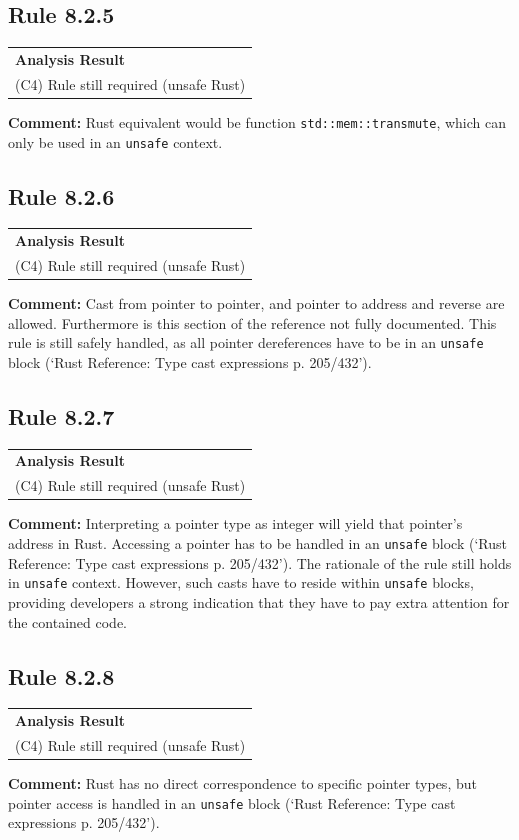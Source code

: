 \subsection*{Rule 8.2.5}
\begin{longtable}{p{13cm}}
\textbf{Analysis Result} \\
(C4) Rule still required (unsafe Rust) \\
\end{longtable}
\textbf{Comment:} Rust equivalent would be function \texttt{std::mem::transmute}, which can only be used in an \texttt{unsafe} context. \\
\subsection*{Rule 8.2.6}
\begin{longtable}{p{13cm}}
\textbf{Analysis Result} \\
(C4) Rule still required (unsafe Rust) \\
\end{longtable}
\textbf{Comment:} Cast from pointer to pointer, and pointer to address and reverse are allowed. Furthermore is this section of the reference not fully documented. This rule is still safely handled, as all pointer dereferences have to be in an \texttt{unsafe} block (`Rust Reference: Type cast expressions p. 205/432'). \\
\subsection*{Rule 8.2.7}
\begin{longtable}{p{13cm}}
\textbf{Analysis Result} \\
(C4) Rule still required (unsafe Rust) \\
\end{longtable}
\textbf{Comment:} Interpreting a pointer type as integer will yield that pointer's address in Rust. Accessing a pointer has to be handled in an \texttt{unsafe} block (`Rust Reference: Type cast expressions p. 205/432'). The rationale of the rule still holds in \texttt{unsafe} context. However, such casts have to reside within \texttt{unsafe} blocks, providing developers a strong indication that they have to pay extra attention for the contained code. \\
\subsection*{Rule 8.2.8}
\begin{longtable}{p{13cm}}
\textbf{Analysis Result} \\
(C4) Rule still required (unsafe Rust) \\
\end{longtable}
\textbf{Comment:} Rust has no direct correspondence to specific pointer types, but pointer access is handled in an \texttt{unsafe} block (`Rust Reference: Type cast expressions p. 205/432'). \\
